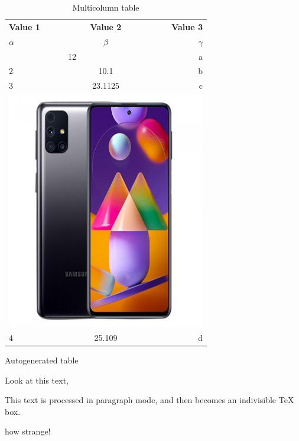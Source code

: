 \documentclass{article}
\begin{document}
	\begin{table}[h!]
		\begin{center}
		\caption{Multicolumn table}
		\label{tab:table 3}
			\begin{tabular}{|l|c|r|}
				\hline
				\textbf{Value 1} & \textbf{Value 2} & \textbf{Value 3}\\
				$\alpha$ & $\beta$ & $\gamma$\\
				\hline
				\multicolumn{2}{|c|}{12} & a\\
				\hline
				2 & 10.1 & b\\
				3 & 23.1125 & c\\
				\hline
				\multicolumn{3}{|c|}{\includegraphics[scale=0.5]{phone.jpg}}\\
				\hline
				4 & 25.109 & d\\
				\hline
			\end{tabular}
		\end{center}
	\end{table}
	\newpage
	
	
	
	\begin{table}[h!]
		\caption{Autogenerated table}
		\label{table1}
		
		
	\end{table}



	
	Look at this text,
	\begin{minipage}{3cm}
		This text is processed in paragraph mode, and then becomes an indivisible \TeX{} box.
	\end{minipage}
	how strange!
\end{document}
